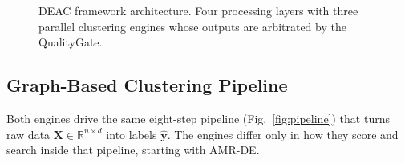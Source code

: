 \documentclass[conference]{IEEEtran}
\begin{document}
\begin{figure}[!t]
\caption{DEAC framework architecture. Four processing layers with three parallel clustering engines whose outputs are arbitrated by the QualityGate.}
\label{fig:system}
\end{figure}

\subsection{Graph-Based Clustering Pipeline}

Both engines drive the same eight-step pipeline (Fig.~\ref{fig:pipeline}) that turns raw data $\mathbf{X} \in \mathbb{R}^{n \times d}$ into labels $\hat{\mathbf{y}}$. The engines differ only in how they score and search inside that pipeline, starting with AMR-DE.
\end{document}
